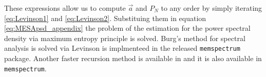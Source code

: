 \documentclass[twocolumn,showpacs,preprintnumbers,nofootinbib,prd,
superscriptaddress,10pt]{revtex4-1}
\begin{document}
These expressions allow us to compute $\vec a$ and $P_N$ to any order by simply iterating \eqref{eq:Levinson1} and \eqref{eq:Levinson2}. Substituing them in equation \eqref{eq:MESApsd_appendix} the problem of the estimation for the power spectral density via maximum entropy principle is solved.
Burg's method for spectral analysis is solved via Levinson is implmenteed in the released \texttt{memspectrum} package.
Another faster recursion method is available in \cite{Vos} and it is also available in \texttt{memspectrum}.

\newpage

	
	
\end{document}
